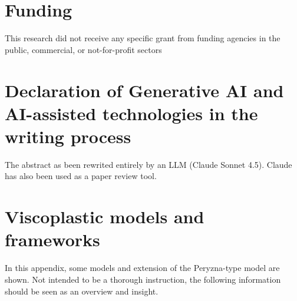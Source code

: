 \documentclass[final,5p,times,twocolumn]{elsarticle}
\begin{document}
\section{Funding}
This research did not receive any specific grant from funding agencies in the public, commercial, or not-for-profit sectors

\section{Declaration of Generative AI and AI-assisted technologies in the writing process}
The abstract as been rewrited entirely by an LLM (Claude Sonnet 4.5). Claude has also been used as a paper review tool.


\appendix
\section{Viscoplastic models and frameworks}
\label{app:models}

In this appendix, some models and extension of the Peryzna-type model are shown. Not intended to be a thorough instruction, the following information should be seen as an overview and insight.
\end{document}
